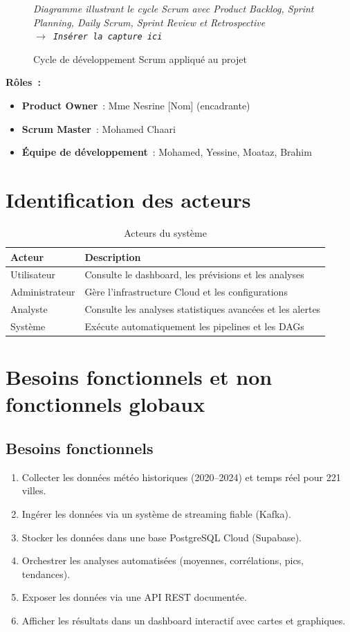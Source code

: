 \documentclass[a4paper,12pt,oneside]{report}
\newcommand{\imgplaceholder}[2]{%
  \begin{tcolorbox}[colback=blue!5,colframe=blue!40,title=#1]
    \centering\itshape #2\\[6pt]
    \texttt{$\rightarrow$ Insérer la capture ici}
  \end{tcolorbox}
}
\begin{document}
\begin{figure}[H]
\centering
\imgplaceholder{Figure~\ref{fig:scrum_cycle} — Cycle Scrum}{Diagramme illustrant le cycle Scrum avec Product Backlog, Sprint Planning, Daily Scrum, Sprint Review et Retrospective}
\caption{Cycle de développement Scrum appliqué au projet}
\label{fig:scrum_cycle}
\end{figure}

\textbf{Rôles~:}
\begin{itemize}
  \item \textbf{Product Owner}~: Mme Nesrine [Nom] (encadrante)
  \item \textbf{Scrum Master}~: Mohamed Chaari
  \item \textbf{Équipe de développement}~: Mohamed, Yessine, Moataz, Brahim
\end{itemize}

\section{Identification des acteurs}

\begin{table}[H]
\centering
\caption{Acteurs du système}
\label{tab:acteurs}
\begin{tabularx}{\textwidth}{lX}
\toprule
\textbf{Acteur} & \textbf{Description} \\
\midrule
Utilisateur    & Consulte le dashboard, les prévisions et les analyses \\
Administrateur & Gère l'infrastructure Cloud et les configurations \\
Analyste       & Consulte les analyses statistiques avancées et les alertes \\
Système        & Exécute automatiquement les pipelines et les DAGs \\
\bottomrule
\end{tabularx}
\end{table}

\section{Besoins fonctionnels et non fonctionnels globaux}

\subsection{Besoins fonctionnels}
\begin{enumerate}
  \item Collecter les données météo historiques (2020--2024) et temps réel pour 221 villes.
  \item Ingérer les données via un système de streaming fiable (Kafka).
  \item Stocker les données dans une base PostgreSQL Cloud (Supabase).
  \item Orchestrer les analyses automatisées (moyennes, corrélations, pics, tendances).
  \item Exposer les données via une API REST documentée.
  \item Afficher les résultats dans un dashboard interactif avec cartes et graphiques.
\end{enumerate}
\end{document}
